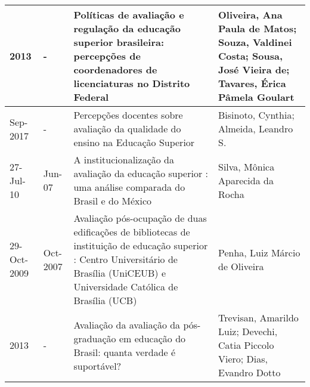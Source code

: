 \begin{table}
{\begin{tabular}{|m{1.3cm}|m{1.3cm}|p{7cm}|p{6cm}|}
2013        & -           & Políticas de avaliação e regulação da educação superior brasileira: percepções de coordenadores de licenciaturas no Distrito Federal                                                                                  & Oliveira, Ana Paula de Matos; Souza, Valdinei Costa; Sousa, José Vieira de; Tavares, Érica Pâmela Goulart                                                                                                                                                    \\ \hline
Sep-2017    & -           & Percepções docentes sobre avaliação da qualidade do ensino na Educação Superior                                                                                                                                       & Bisinoto, Cynthia; Almeida, Leandro S.                                                                                                                                                                                                                       \\ \hline
27-Jul-10   & Jun-07      & A institucionalização da avaliação da educação superior : uma análise comparada do Brasil e do México                                                                                                                 & Silva, Mônica Aparecida da Rocha                                                                                                                                                                                                                             \\ \hline
29-Oct-2009 & Oct-2007    & Avaliação pós-ocupação de duas edificações de bibliotecas de instituição de educação superior : Centro Universitário de Brasília (UniCEUB) e Universidade Católica de Brasília (UCB)                                  & Penha, Luiz Márcio de Oliveira                                                                                                                                                                                                                               \\ \hline
2013        & -           & Avaliação da avaliação da pós-graduação em educação do Brasil: quanta verdade é suportável?                                                                                                                           & Trevisan, Amarildo Luiz; Devechi, Catia Piccolo Viero; Dias, Evandro Dotto                                                                                                                                                                                   \\ \hline

\end{tabular}}
\end{table}
